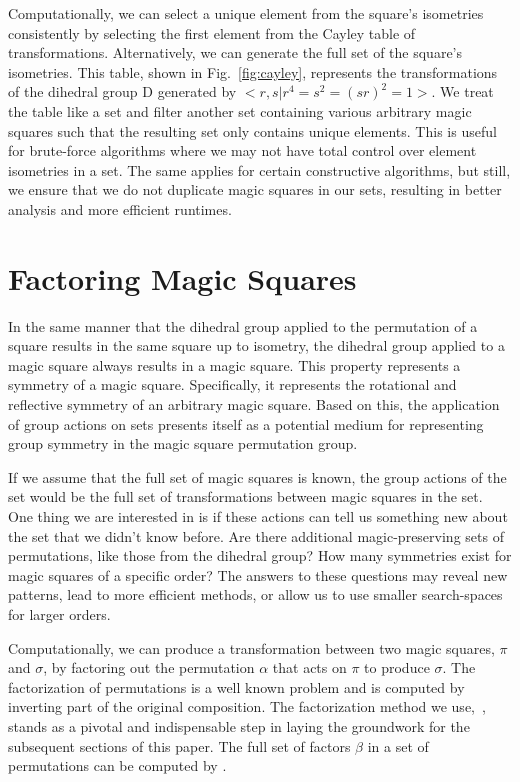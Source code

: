 \documentclass[12pt]{report}
\begin{document}
\par Computationally, we can select a unique element from the square's isometries consistently by
selecting the first element from the Cayley table of transformations. Alternatively, we can
generate the full set of the square's isometries. This table, shown in Fig.~\ref{fig:cayley},
represents the transformations of the dihedral group D generated by $<r,s\vert
  r^4=s^2={\left(sr\right)}^2=1>$. We treat the table like a set and filter another set containing
various arbitrary magic squares such that the resulting set only contains unique elements. This is
useful for brute-force algorithms where we may not have total control over element isometries in a
set. The same applies for certain constructive algorithms, but still, we ensure that we do not
duplicate magic squares in our sets, resulting in better analysis and more efficient runtimes.

\section{Factoring Magic Squares}

\par In the same manner that the dihedral group applied to the permutation of a square results in
the same square up to isometry, the dihedral group applied to a magic square always results in a
magic square. This property represents a symmetry of a magic square. Specifically, it represents
the rotational and reflective symmetry of an arbitrary magic square. Based on this, the application
of group actions on sets presents itself as a potential medium for representing group symmetry in
the magic square permutation group.

\par If we assume that the full set of magic squares is known, the group actions of the set would
be the full set of transformations between magic squares in the set. One thing we are interested in
is if these actions can tell us something new about the set that we didn't know before. Are there
additional magic-preserving sets of permutations, like those from the dihedral group? How many
symmetries exist for magic squares of a specific order? The answers to these questions may reveal
new patterns, lead to more efficient methods, or allow us to use smaller search-spaces for larger
orders.

\par Computationally, we can produce a transformation between two magic squares, $\pi$ and
$\sigma$, by factoring out the permutation $\alpha$ that acts on $\pi$ to produce $\sigma$. The
factorization of permutations is a well known problem and is computed by inverting part of the
original composition. The factorization method we
use,~\unboldmath, stands as a pivotal and indispensable step in
laying the groundwork for the subsequent sections of this paper. The full set of factors $\beta$ in
a set of permutations can be computed by \unboldmath.
\end{document}
